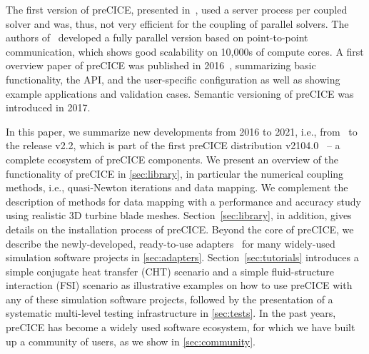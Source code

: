 The first version of preCICE, presented in~\cite{Gatzhammer2015}, used a server process per coupled solver and was, thus, not very efficient for the coupling of parallel solvers. The authors of~\cite{Uekermann2016, Lindner2019, Bungartz2016_ExaFSA_LNCSE} developed a fully parallel version based on point-to-point communication, which shows good scalability on 10,000s of compute cores. A first overview paper of preCICE was published in 2016~\cite{Bungartz2016_preCICE}, summarizing basic functionality, the API, and the user-specific configuration as well as showing example applications and validation cases. Semantic versioning of preCICE was introduced in 2017.

In this paper, we summarize new developments from 2016 to 2021, i.e., from~\cite{Bungartz2016_preCICE} to the release v2.2, which is part of the first preCICE distribution v2104.0~\cite{Chourdakis2021_Distribution} -- a complete ecosystem of preCICE components. We present an overview of the functionality of preCICE in \autoref{sec:library}, in particular the numerical coupling methods, i.e., quasi-Newton iterations and data mapping. We complement the description of methods for data mapping with a performance and accuracy study using realistic 3D turbine blade meshes. Section~\ref{sec:library}, in addition, gives details on the installation process of preCICE. Beyond the core of preCICE, we describe the newly-developed, ready-to-use adapters~\cite{Uekermann2017_Adapters} for many widely-used simulation software projects in \autoref{sec:adapters}. Section~\ref{sec:tutorials} introduces a simple conjugate heat transfer (CHT) scenario and a simple fluid-structure interaction (FSI) scenario as illustrative examples on how to use preCICE with any of these simulation software projects, followed by the presentation of a systematic multi-level testing infrastructure in \autoref{sec:tests}. In the past years, preCICE has become a widely used software ecosystem, for which we have built up a community of users, as we show in \autoref{sec:community}.

